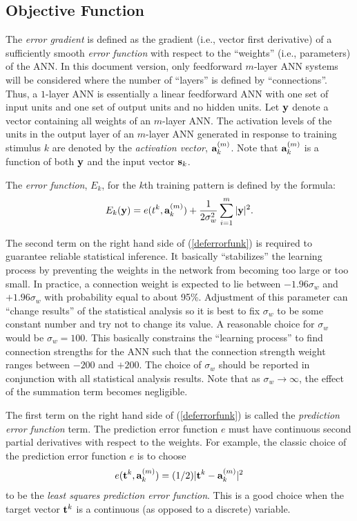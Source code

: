 \documentclass{report}
\begin{document}
\subsection{Objective Function}\label{objFunc}

The {\em error gradient} is defined as the gradient (i.e., vector
first derivative) of a sufficiently smooth {\em error function} with
respect to the ``weights'' (i.e., parameters) of the ANN. In this
document version, only feedforward $m$-layer ANN systems will be
considered where the number of ``layers'' is defined by
``connections''. Thus, a $1$-layer ANN is essentially a linear
feedforward ANN with one set of input units and one set of output
units and no hidden units.  Let ${\bf y}$ denote a vector containing
all weights of an $m$-layer ANN. The activation levels of the units in
the output layer of an $m$-layer ANN generated in response to training
stimulus $k$ are denoted by the {\em activation vector}, ${\bf
a}^{(m)}_k$.  Note that ${\bf a}^{(m)}_k$ is a function of both ${\bf
y}$ and the input vector ${\bf s}_k$.

The {\em error function}, $E_k$, for the $k$th training pattern is
defined by the formula:
\begin{equation}\label{deferrorfunk}
E_k({\bf y}) =
e(t^k, {\bf a}^{(m)}_k) +
\frac{1}{2\sigma_w^2} \sum_{i=1}^m |{\bf y}|^2.
\end{equation}

The second term on the right hand side of (\ref{deferrorfunk}) is
required to guarantee reliable statistical inference.
 It basically ``stabilizes'' the learning process
by preventing the weights in the network from becoming too large or
too small.  In practice, a connection weight is expected to lie
between $-1.96 \sigma_w$ and $+1.96 \sigma_w$ with probability equal
to about 95\%. Adjustment of this parameter can ``change results'' of
the statistical analysis so it is best to fix $\sigma_w$ to be some
constant number and try not to change its value. A reasonable choice
for $\sigma_w$ would be $\sigma_w = 100$. This basically constrains
the ``learning process'' to find connection strengths for the ANN such
that the connection strength weight ranges between $-200$ and $+200$.
The choice of $\sigma_w$ should be reported in conjunction with all
statistical analysis results. Note that as
$\sigma_w \rightarrow \infty$, the effect of the summation term
becomes negligible.

The first term on the right hand side of (\ref{deferrorfunk}) is
called the {\em prediction error function} term. The prediction error
function $e$ must have continuous second partial derivatives with
respect to the weights.  For example, the classic choice of the
prediction error function $e$ is to choose
\begin{equation}
\label{leastsquaresfunk}
e({\bf t}^k, {\bf a}^{(m)}_k) = (1/2)|{\bf t}^k - {\bf a}^{(m)}_k|^2
\end{equation}
to be the {\em least squares prediction error function}.  This is a
good choice when the target vector ${\bf t}^k$ is a continuous (as
opposed to a discrete) variable.
\end{document}
